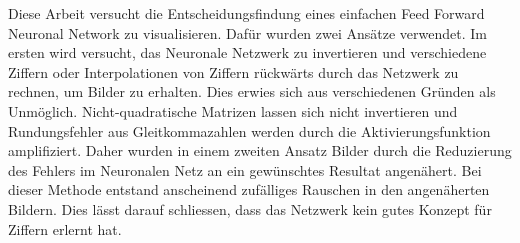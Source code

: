 \documentclass[Interploate_hadwritten_Digits.tex]{subfiles}
\begin{document}
	Diese Arbeit versucht die Entscheidungsfindung eines einfachen Feed Forward Neuronal Network zu visualisieren. Dafür wurden zwei Ansätze verwendet. Im ersten wird versucht, das Neuronale Netzwerk zu invertieren und verschiedene Ziffern oder Interpolationen von Ziffern rückwärts durch das Netzwerk zu rechnen, um Bilder zu erhalten. Dies erwies sich aus verschiedenen Gründen als Unmöglich. Nicht-quadratische Matrizen lassen sich nicht invertieren und Rundungsfehler aus Gleitkommazahlen werden durch die Aktivierungsfunktion amplifiziert. Daher wurden in einem zweiten Ansatz Bilder durch die Reduzierung des Fehlers im Neuronalen Netz an ein gewünschtes Resultat angenähert. Bei dieser Methode entstand anscheinend zufälliges Rauschen in den angenäherten Bildern. Dies lässt darauf schliessen, dass das Netzwerk kein gutes Konzept für Ziffern erlernt hat.
\end{document}
